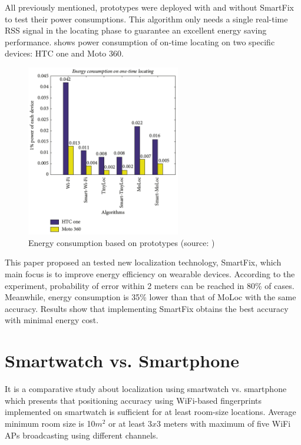 All previously mentioned, prototypes were deployed with and without SmartFix to test their power consumptions. This algorithm only needs a single real-time RSS signal in the locating phase to guarantee an excellent energy saving performance.  shows power consumption of on-time locating on two specific devices: HTC one and Moto 360. 

\begin{figure}[H]
	\begin{centering}
		\includegraphics[width=0.6\textwidth]{img/smart_fix}
		\par\end{centering}
	\caption{Energy consumption based on prototypes (source: \cite{SmartFix})\label{fig:SmartFix}}
	\label{fig01c03}
\end{figure}

This paper proposed an tested new localization technology, SmartFix, which main focus is to improve energy efficiency on wearable devices. According to the experiment, probability of error within 2 meters can be reached in 80\% of cases. Meanwhile, energy consumption is 35\% lower than that of MoLoc with the same accuracy. Results show that implementing SmartFix obtains the best accuracy with minimal energy cost.

\section{Smartwatch vs. Smartphone}\label{sec:SWvsSP}
It is a comparative study about localization using smartwatch vs. smartphone \cite{SWvsSP} which presents that positioning accuracy using WiFi-based fingerprints implemented on smartwatch is sufficient for at least room-size locations. Average minimum room size is 10$m^2$ or at least 3$x$3 meters with maximum of five WiFi APs broadcasting using different channels.


